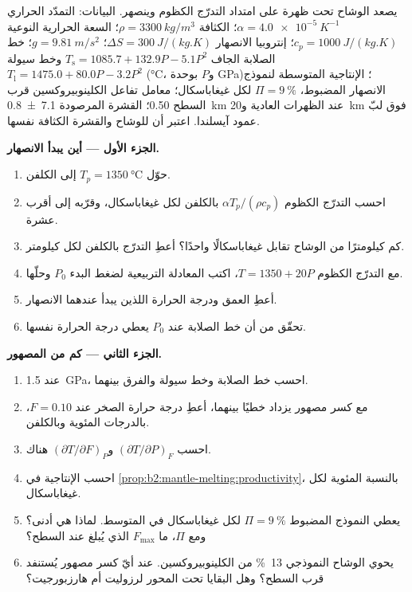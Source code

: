 \begin{problem}
\label{pb:b2:mantle-melting:1}
يصعد الوشاح تحت ظهرة على امتداد التدرّج الكظوم وينصهر. البيانات: التمدّد
الحراري $\alpha = \qty{4.0e-5}{K^{-1}}$؛ الكثافة $\rho = \qty{3300}{kg/m^3}$؛
السعة الحرارية النوعية $c_p = \qty{1000}{J/(kg.K)}$؛ إنتروبيا الانصهار $\Delta S =
\qty{300}{J/(kg.K)}$؛ $g = \qty{9.81}{m/s^2}$؛ خط الصلابة الجاف $T_{\mathrm s} =
1085.7 + 132.9P - 5.1P^2$ وخط سيولة  $T_{\mathrm l} = 1475.0 +
80.0P - 3.2P^2$ (\unit{\celsius}، و$P$ بوحدة \unit{GPa})؛ الإنتاجية المتوسطة
لنموذج الانصهار المضبوط، $\Pi = \qty{9}{\percent}$ لكل غيغاباسكال؛ معامل تفاعل
الكلينوبيروكسين قرب السطح 0.50؛ القشرة المرصودة \qty[uncertainty-mode=separate]{7.1 \pm 0.8}{km}
عند الظهرات العادية و\qty{20}{km} فوق لبّ عمود آيسلندا. اعتبر أن للوشاح
والقشرة الكثافة نفسها.

\noindent\textbf{الجزء الأول --- أين يبدأ الانصهار.}
\begin{enumerate}
\item حوّل $T_p = \qty{1350}{\celsius}$ إلى الكلفن.
\item احسب التدرّج الكظوم $\alpha T_p/(\rho c_p)$ بالكلفن لكل
غيغاباسكال، وقرّبه إلى أقرب عشرة.
\item كم كيلومترًا من الوشاح تقابل غيغاباسكالًا واحدًا؟ أعطِ التدرّج بالكلفن
لكل كيلومتر.
\item مع التدرّج الكظوم $T = 1350 + 20P$، اكتب المعادلة التربيعية لضغط البدء
$P_0$ وحلّها.
\item أعطِ العمق ودرجة الحرارة اللذين يبدأ عندهما الانصهار.
\item تحقّق من أن خط الصلابة عند $P_0$ يعطي درجة الحرارة نفسها.
\end{enumerate}

\noindent\textbf{الجزء الثاني --- كم من المصهور.}
\begin{enumerate}[resume]
\item عند \qty{1.5}{GPa}، احسب خط الصلابة وخط سيولة 
والفرق بينهما.
\item مع كسر مصهور يزداد خطيًا بينهما، أعطِ درجة حرارة
الصخر عند $F = 0.10$، بالدرجات المئوية وبالكلفن.
\item احسب $(\partial T/\partial P)_F$ و$(\partial T/\partial F)_P$ هناك.
\item احسب الإنتاجية في \cref{prop:b2:mantle-melting:productivity}، بالنسبة
المئوية لكل غيغاباسكال.
\item يعطي النموذج المضبوط $\Pi = \qty{9}{\percent}$ لكل غيغاباسكال في المتوسط.
لماذا هي أدنى؟ ومع $\Pi$، ما  $F_{\max}$ الذي يُبلغ عند
السطح؟
\item يحوي الوشاح النموذجي \qty{13}{\percent} من الكلينوبيروكسين. عند أيّ كسر مصهور
يُستنفد قرب السطح؟ وهل البقايا تحت المحور
لرزوليت أم هارزبورجيت؟
\end{enumerate}


\end{problem}
